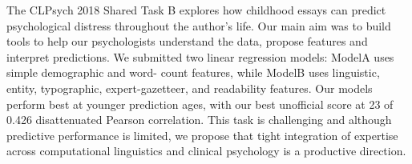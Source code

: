 The CLPsych 2018 Shared Task B explores how childhood essays can predict psychological distress throughout the author's life. Our main aim was to build tools to help our psychologists understand the data, propose features and interpret predictions. We submitted two linear regression models: ModelA uses simple demographic and word- count features, while ModelB uses linguistic, entity, typographic, expert-gazetteer, and readability features. Our models perform best at younger prediction ages, with our best unofficial score at 23 of 0.426 disattenuated Pearson correlation. This task is challenging and although predictive performance is limited, we propose that tight integration of expertise across computational linguistics and clinical psychology is a productive direction.
